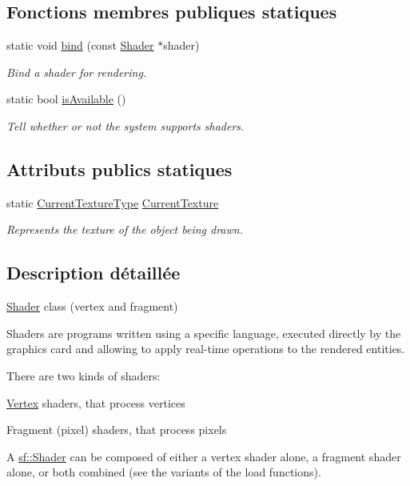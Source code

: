 \subsection*{Fonctions membres publiques statiques}
\begin{DoxyCompactItemize}
\item 
static void \hyperlink{classsf_1_1Shader_a09778f78afcbeb854d608c8dacd8ea30}{bind} (const \hyperlink{classsf_1_1Shader}{Shader} $\ast$shader)
\begin{DoxyCompactList}\small\item\em Bind a shader for rendering. \end{DoxyCompactList}\item 
static bool \hyperlink{classsf_1_1Shader_ad22474690bafe4a305c1b9826b1bd86a}{is\+Available} ()
\begin{DoxyCompactList}\small\item\em Tell whether or not the system supports shaders. \end{DoxyCompactList}\end{DoxyCompactItemize}
\subsection*{Attributs publics statiques}
\begin{DoxyCompactItemize}
\item 
static \hyperlink{structsf_1_1Shader_1_1CurrentTextureType}{Current\+Texture\+Type} \hyperlink{classsf_1_1Shader_ac84c7953eec2e19358ea6e2cc5385b8d}{Current\+Texture}
\begin{DoxyCompactList}\small\item\em Represents the texture of the object being drawn. \end{DoxyCompactList}\end{DoxyCompactItemize}


\subsection{Description détaillée}
\hyperlink{classsf_1_1Shader}{Shader} class (vertex and fragment) 

Shaders are programs written using a specific language, executed directly by the graphics card and allowing to apply real-\/time operations to the rendered entities.

There are two kinds of shaders\+: \begin{DoxyItemize}
\item \hyperlink{classsf_1_1Vertex}{Vertex} shaders, that process vertices \item Fragment (pixel) shaders, that process pixels\end{DoxyItemize}
A \hyperlink{classsf_1_1Shader}{sf\+::\+Shader} can be composed of either a vertex shader alone, a fragment shader alone, or both combined (see the variants of the load functions).


